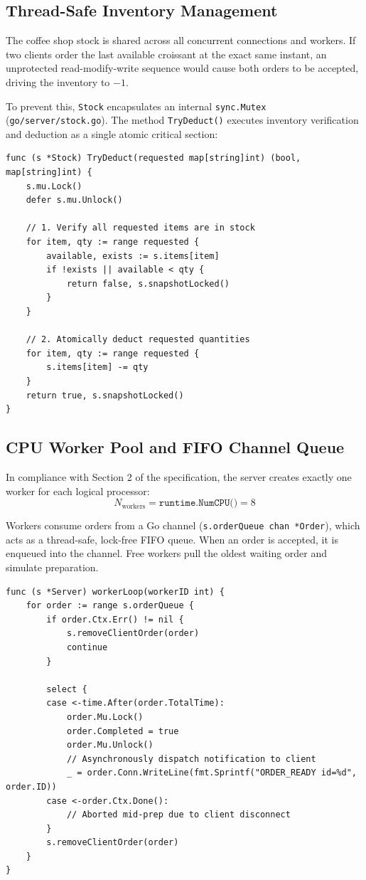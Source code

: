 \documentclass{labreport}
\begin{document}
\subsection{Thread-Safe Inventory Management}
The coffee shop stock is shared across all concurrent connections and workers. If two clients order the last available croissant at the exact same instant, an unprotected read-modify-write sequence would cause both orders to be accepted, driving the inventory to $-1$.

To prevent this, \texttt{Stock} encapsulates an internal \texttt{sync.Mutex} (\texttt{go/server/stock.go}). The method \texttt{TryDeduct()} executes inventory verification and deduction as a single atomic critical section:

\begin{lstlisting}[style=golang, caption={Atomic Stock Verification and Deduction}]
func (s *Stock) TryDeduct(requested map[string]int) (bool, map[string]int) {
    s.mu.Lock()
    defer s.mu.Unlock()

    // 1. Verify all requested items are in stock
    for item, qty := range requested {
        available, exists := s.items[item]
        if !exists || available < qty {
            return false, s.snapshotLocked()
        }
    }

    // 2. Atomically deduct requested quantities
    for item, qty := range requested {
        s.items[item] -= qty
    }
    return true, s.snapshotLocked()
}
\end{lstlisting}

\subsection{CPU Worker Pool and FIFO Channel Queue}
In compliance with Section 2 of the specification, the server creates exactly one worker for each logical processor:
\begin{equation}
N_{\text{workers}} = \texttt{runtime.NumCPU()} = 8
\end{equation}

Workers consume orders from a Go channel (\texttt{s.orderQueue chan *Order}), which acts as a thread-safe, lock-free FIFO queue. When an order is accepted, it is enqueued into the channel. Free workers pull the oldest waiting order and simulate preparation.

\begin{lstlisting}[style=golang, caption={Worker Loop with Cancellation and Readiness Dispatch}]
func (s *Server) workerLoop(workerID int) {
    for order := range s.orderQueue {
        if order.Ctx.Err() != nil {
            s.removeClientOrder(order)
            continue
        }

        select {
        case <-time.After(order.TotalTime):
            order.Mu.Lock()
            order.Completed = true
            order.Mu.Unlock()
            // Asynchronously dispatch notification to client
            _ = order.Conn.WriteLine(fmt.Sprintf("ORDER_READY id=%d", order.ID))
        case <-order.Ctx.Done():
            // Aborted mid-prep due to client disconnect
        }
        s.removeClientOrder(order)
    }
}
\end{lstlisting}
\end{document}
